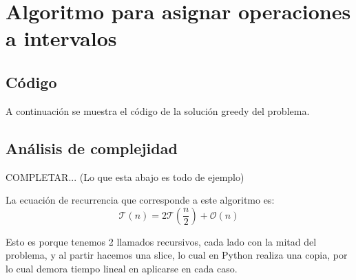 \section{Algoritmo para asignar operaciones a intervalos}

\subsection{Código}


A continuación se muestra el código de la solución greedy del problema. 





% 




\subsection{Análisis de complejidad}

COMPLETAR... (Lo que esta abajo es todo de ejemplo)

La ecuación de recurrencia que corresponde a este algoritmo es: 
\begin{equation*} %
    \mathcal{T}(n) = 2 \mathcal{T}\left(\frac{n}{2}\right) + \mathcal{O}(n)
\end{equation*}

Esto es porque tenemos 2 llamados recursivos, cada lado con la mitad del problema, y al partir hacemos una slice, lo cual en Python realiza una copia, por lo cual demora tiempo lineal en aplicarse en cada caso. 

